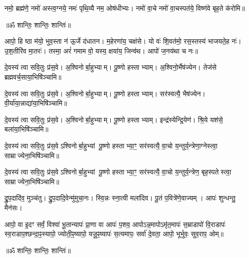 नमो॒ ब्रह्म॑णे॒ नमो॑ अस्त्व॒ग्नये॒ नमः॑ पृथि॒व्यै नम॒ ओष॑धीभ्यः।
नमो॑ वा॒चे नमो॑ वा॒चस्पत॑ये॒ विष्ण॑वे बृह॒ते क॑रोमि॥

\centerline{॥ॐ शान्तिः॒ शान्तिः॒ शान्तिः॑॥}


आपो॒ हि ष्ठा म॑यो॒ भुव॒स्ता न॑ ऊ॒र्जे द॑धातन।
म॒हेरणा॑य॒ चक्ष॑से। यो वः॑ शि॒वत॑मो॒ रस॒स्तस्य॑ भाजयते॒ह नः॑।
उ॒श॒तीरि॑व मा॒तरः॑। तस्मा॒ अरं॑ गमाम वो॒ यस्य॒ क्षया॑य॒ जिन्व॑थ।
आपो॑ ज॒नय॑था च नः॥

दे॒वस्य॑ त्वा सवि॒तुः प्र॑स॒वे। अ॒श्विनोर्बा॒हुभ्याम्। पू॒ष्णो हस्ताभ्याम्।
अ॒श्विनो॒र्भैष॑ज्येन। तेज॑से ब्रह्मवर्च॒साया॒भिषि॑ञ्चामि॥

दे॒वस्य॑ त्वा सवि॒तुः प्र॑स॒वे। अ॒श्विनोर्बा॒हुभ्याम्। पू॒ष्णो हस्ताभ्याम्।
सर॑स्वत्यै॒ भैष॑ज्येन। वी॒र्या॑या॒न्नाद्या॑या॒भिषि॑ञ्चामि॥

दे॒वस्य॑ त्वा सवि॒तुः प्र॑स॒वे। अ॒श्विनोर्बा॒हुभ्याम्। पू॒ष्णो हस्ताभ्याम्।
इन्द्र॑स्येन्द्रि॒येण॑। श्रि॒ये यश॑से॒ बला॑या॒भिषि॑ञ्चामि॥

दे॒वस्य॑ त्वा सवि॒तुः प्र॑स॒वेऽश्विनोर्बा॒हुभ्यां पू॒ष्णो हस्ताभ्या॒ꣳ॒
सर॑स्वत्यै॒ वा॒चो य॒न्तुर्य॒न्त्रेणा॒ग्नेस्त्वा॒ साम्राज्येना॒भिषि॑ञ्चामि॥

दे॒वस्य॑ त्वा सवि॒तुः प्र॑स॒वेऽश्विनोर्बा॒हुभ्यां पू॒ष्णो हस्ताभ्या॒ꣳ॒
सर॑स्वत्यै॒ वा॒चो य॒न्तुर्य॒न्त्रेण॒ बृह॒स्पतेस्त्वा॒ साम्राज्येना॒भिषि॑ञ्चामि॥

द्रु॒प॒दादि॑व॒ मुञ्च॑तु। द्रु॒प॒दादि॒वेन्मु॑मुचा॒नः।
स्वि॒न्नः स्ना॒त्वी मला॑दिव। पू॒तं प॒वित्रे॑णे॒वाज्यम्।
आपः॑ शुन्धन्तु॒ मैन॑सः।

आपो॒ वा इ॒दꣳ सर्वं॒ विश्वा॑ भू॒तान्यापः॑ प्रा॒णा वा आपः॑ प॒शव॒ आपोऽन्न॒मापोऽमृ॑त॒मापः॑ स॒म्राडापो॑ वि॒राडापः॑ स्व॒राडाप॒श्छन्दा॒ꣴ॒स्यापो॒ ज्योती॒ꣴ॒ष्यापो॒ यजू॒ꣴ॒ष्यापः॑ स॒त्यमापः॒ सर्वा॑ दे॒वता॒ आपो॒ भूर्भुवः॒ सुव॒राप॒ ओम्॥

\centerline{॥ॐ शान्तिः॒ शान्तिः॒ शान्तिः॑॥}